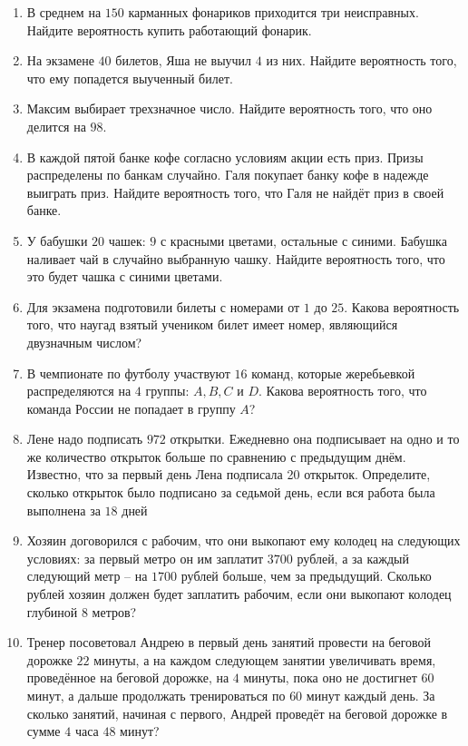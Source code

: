 \documentclass[12pt, a4paper]{article}
\begin{document}
	
	\begin{enumerate}
		\item В среднем на $150$ карманных фонариков приходится три неисправных. Найдите вероятность купить работающий фонарик.
		\item На экзамене $40$ билетов, Яша не выучил $4$ из них. Найдите вероятность того, что ему попадется выученный билет.
		\item Максим выбирает трехзначное число. Найдите вероятность того, что оно делится на $98$.
		\item В каждой пятой банке кофе согласно условиям акции есть приз. Призы распределены по банкам случайно. Галя покупает банку кофе в надежде выиграть приз. Найдите вероятность того, что Галя не найдёт приз в своей банке.
		\item У бабушки $20$ чашек: $9$ с красными цветами, остальные с синими. Бабушка наливает чай в случайно выбранную чашку. Найдите вероятность того, что это будет чашка с синими цветами.
		\item Для экзамена подготовили билеты с номерами от $1$ до $25$. Какова вероятность того, что наугад взятый учеником билет имеет номер, являющийся двузначным числом?
		\item В чемпионате по футболу участвуют $16$ команд, которые жеребьевкой распределяются на $4$ группы: $A, B, C$ и $D$. Какова вероятность того, что команда России не попадает в группу $A$?
		\item Лене надо подписать $972$ открытки. Ежедневно она подписывает на одно и то же количество открыток больше по сравнению с предыдущим днём. Известно, что за первый день Лена подписала 20 открыток. Определите, сколько открыток было подписано за седьмой день, если вся работа была выполнена за $18$ дней
		\item Хозяин договорился с рабочим, что они выкопают ему колодец на следующих условиях: за первый метро он им заплатит $3700$ рублей, а за каждый следующий метр – на $1700$ рублей больше, чем за предыдущий. Сколько рублей хозяин должен будет заплатить рабочим, если они выкопают колодец глубиной $8$ метров?
		\item Тренер посоветовал Андрею в первый день занятий провести на беговой дорожке $22$ минуты, а на каждом следующем занятии увеличивать время, проведённое на беговой дорожке, на $4$ минуты, пока оно не достигнет $60$ минут, а дальше продолжать тренироваться по $60$ минут каждый день. За сколько занятий, начиная с первого, Андрей проведёт на беговой дорожке в сумме $4$ часа $48$ минут?
	\end{enumerate}
\end{document}
